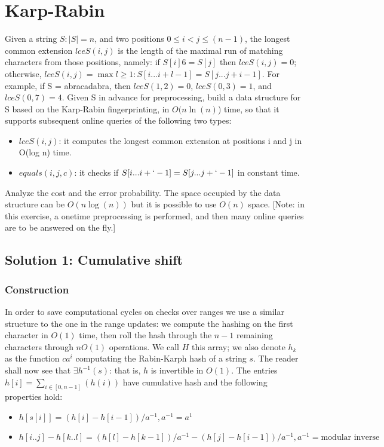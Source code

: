 \documentclass{article}
\begin{document}
\section{Karp-Rabin}
Given a string $S: |S| = n$, and two positions $0 \leq i < j \leq (n - 1)$,
the longest common extension $lceS(i, j)$ is the length of the maximal run of matching
characters from those positions, namely: if $S[i] 6= S[j]$ then $lceS(i, j) = 0$;
otherwise, $lceS(i, j) = \max{l \geq 1 : S[i ... i + l - 1] = S[j ... j + i - 1]}$.
For example, if S = abracadabra, then $lceS(1, 2) = 0$, $lceS(0, 3) = 1$, and
$lceS(0, 7) = 4$.
Given S in advance for preprocessing, build a data structure for S based
on the Karp-Rabin fingerprinting, in $O(n \ln(n)$) time, so that it supports subsequent
online queries of the following two types:
    \begin{itemize}
    \item $lceS(i, j)$: it computes the longest common extension at positions i
    and j in O(log n) time.
    \item $equals (i, j, c)$: it checks if $S[i ... i + ` - 1] = S[j ... j + ` - 1]$
    in constant time.
    \end{itemize}
Analyze the cost and the error probability.
The space occupied by the data structure can be $O(n \log(n))$ but it is possible
to use $O(n)$ space.
[Note: in this exercise, a onetime preprocessing is performed, and then many online
queries are to be answered on the fly.]

\subsection{Solution 1: Cumulative shift}
\subsubsection{Construction}

In order to save computational cycles on checks over ranges we use a similar structure
to the one in the range updates: we compute the hashing on the first character in $O(1)$
time, then roll the hash through the $n - 1$ remaining characters through $n O(1)$
operations.
We call $H$ this array; we also denote $h_k$ as the function $c a^{i}$ computating
the Rabin-Karph hash of a string $s$.
The reader shall now see that $\exists h^{-1}(s)$: that is, $h$ is invertible in $O(1)$.
The entries $h[i] = \sum_{i \in [0, n - 1]}(h(i))$ have cumulative hash and the following
properties hold:
    \begin{itemize}
    \item $h[s[i]] = (h[i] - h[i - 1]) / a^{-1}, a^{-1} = a^{1}$
    \item $h[i..j] - h[k..l] = (h[l] - h[k - 1]) / a^{-1} -
            (h[j] - h[i - 1]) / a^{-1}, a^{-1} = \textrm{modular inverse}$
    \end{itemize}
\end{document}
